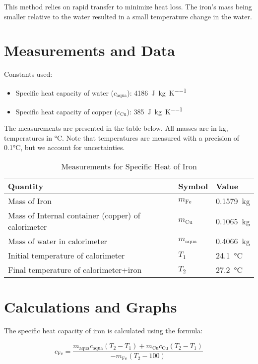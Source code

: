 \documentclass[12pt, a4paper]{article}
\begin{document}
This method relies on rapid transfer to minimize heat loss. The iron's mass being smaller relative to the water resulted in a small temperature change in the water.

\section{Measurements and Data}
Constants used:
\begin{itemize}
	\item Specific heat capacity of water ($c_{\text{aqua}}$): \SI{4186}{\joule\per\kilo\gram\per\kelvin}
	\item Specific heat capacity of copper ($c_{\text{Cu}}$): \SI{385}{\joule\per\kilo\gram\per\kelvin}
\end{itemize}

The measurements are presented in the table below. All masses are in kg, temperatures in °C. Note that temperatures are measured with a precision of 0.1°C, but we account for uncertainties.

\begin{small}
	\begin{longtable}{|l|l|l|}
		\caption{Measurements for Specific Heat of Iron} \label{tab:measurements} \\
		\hline
		\textbf{Quantity} & \textbf{Symbol} & \textbf{Value} \\
		\hline
		Mass of Iron & $m_{\text{Fe}}$ & \SI{0.1579}{\kilo\gram} \\
		Mass of Internal container (copper) of calorimeter & $m_{\text{Cu}}$ & \SI{0.1065}{\kilo\gram} \\
		Mass of water in calorimeter & $m_{\text{aqua}}$ & \SI{0.4066}{\kilo\gram} \\
		Initial temperature of calorimeter & $T_1$ & \SI{24.1}{\celsius} \\
		Final temperature of calorimeter+iron & $T_2$ & \SI{27.2}{\celsius} \\
		\hline
	\end{longtable}
\end{small}

\section{Calculations and Graphs}
The specific heat capacity of iron is calculated using the formula:

\[ c_{\text{Fe}} = \frac{m_{\text{aqua}} c_{\text{aqua}} (T_2 - T_1) + m_{\text{Cu}} c_{\text{Cu}} (T_2 - T_1)}{-m_{\text{Fe}} (T_2 - 100)} \]
\end{document}
